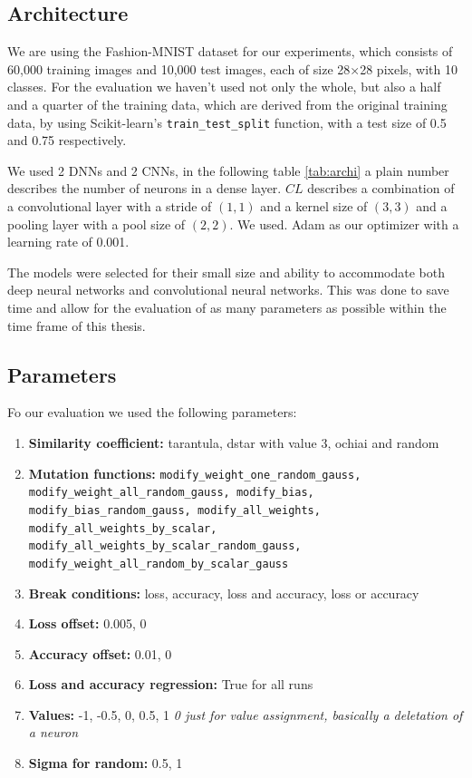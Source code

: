 \subsection{Architecture}\label{subsec:architecture}
We are using the Fashion-MNIST dataset\cite{xiao_fashion-mnist_2017} for our experiments, which consists of 60,000 training images and 10,000 test images, each of size 28×28 pixels, with 10 classes.
For the evaluation we haven't used not only the whole, but also a half and a quarter of the training data, which are derived from the original training data, by using Scikit-learn's\cite{pedregosa_scikit-learn_2011} \texttt{train\_test\_split} function, with a test size of 0.5 and 0.75 respectively.

We used 2 DNNs and 2 CNNs, in the following table \ref{tab:archi} a plain number describes the number of neurons in a dense layer. $CL$ describes a combination of a convolutional layer with a stride of $(1,1)$ and a kernel size of $(3,3)$ and a pooling layer with a pool size of $(2,2)$. We used.
Adam as our optimizer with a learning rate of 0.001.

The models were selected for their small size and ability to accommodate both deep neural networks and convolutional neural networks.
This was done to save time and allow for the evaluation of as many parameters as possible within the time frame of this thesis.

\subsection{Parameters}\label{subsec:parameters}
Fo our evaluation we used the following parameters:
\begin{enumerate}
    \item[]\textbf{Similarity coefficient:} tarantula, dstar with value 3, ochiai and random
    \item[]\textbf{Mutation functions:} \texttt{modify\_weight\_one\_random\_gauss,\\ modify\_weight\_all\_random\_gauss, modify\_bias, modify\_bias\_random\_gauss, modify\_all\_weights, modify\_all\_weights\_by\_scalar,\\modify\_all\_weights\_by\_scalar\_random\_gauss,\\modify\_weight\_all\_random\_by\_scalar\_gauss}
    \item[]\textbf{Break conditions:} loss, accuracy, loss and accuracy, loss or accuracy
    \item[]\textbf{Loss offset:} 0.005, 0
    \item[]\textbf{Accuracy offset:} 0.01, 0
    \item[]\textbf{Loss and accuracy regression:} True for all runs
    \item[]\textbf{Values:} -1, -0.5, 0, 0.5, 1 \textit{0 just for value assignment, basically a deletation of a neuron}
    \item[]\textbf{Sigma for random:} 0.5, 1
\end{enumerate}
